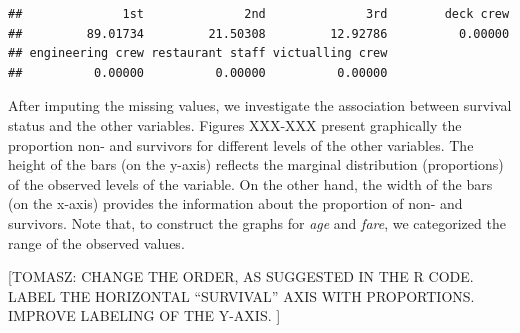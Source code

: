 \documentclass[12pt,]{krantz}
\newenvironment{Shaded}{\begin{snugshade}}{\end{snugshade}}
\newcommand{\DecValTok}[1]{\textcolor[rgb]{0.00,0.00,0.81}{#1}}
\newcommand{\KeywordTok}[1]{\textcolor[rgb]{0.13,0.29,0.53}{\textbf{#1}}}
\newcommand{\NormalTok}[1]{#1}
\newcommand{\OperatorTok}[1]{\textcolor[rgb]{0.81,0.36,0.00}{\textbf{#1}}}
\newcommand{\StringTok}[1]{\textcolor[rgb]{0.31,0.60,0.02}{#1}}
\theoremstyle{definition}
\theoremstyle{definition}
\theoremstyle{definition}
\theoremstyle{remark}
\begin{document}
\begin{verbatim}
##              1st              2nd              3rd        deck crew 
##         89.01734         21.50308         12.92786          0.00000 
## engineering crew restaurant staff victualling crew 
##          0.00000          0.00000          0.00000
\end{verbatim}

\begin{Shaded}
\end{Shaded}

After imputing the missing values, we investigate the association
between survival status and the other variables. Figures XXX-XXX present
graphically the proportion non- and survivors for different levels of
the other variables. The height of the bars (on the y-axis) reflects the
marginal distribution (proportions) of the observed levels of the
variable. On the other hand, the width of the bars (on the x-axis)
provides the information about the proportion of non- and survivors.
Note that, to construct the graphs for \emph{age} and \emph{fare}, we
categorized the range of the observed values.

{[}TOMASZ: CHANGE THE ORDER, AS SUGGESTED IN THE R CODE. LABEL THE
HORIZONTAL ``SURVIVAL'' AXIS WITH PROPORTIONS. IMPROVE LABELING OF THE
Y-AXIS. {]}
\end{document}
